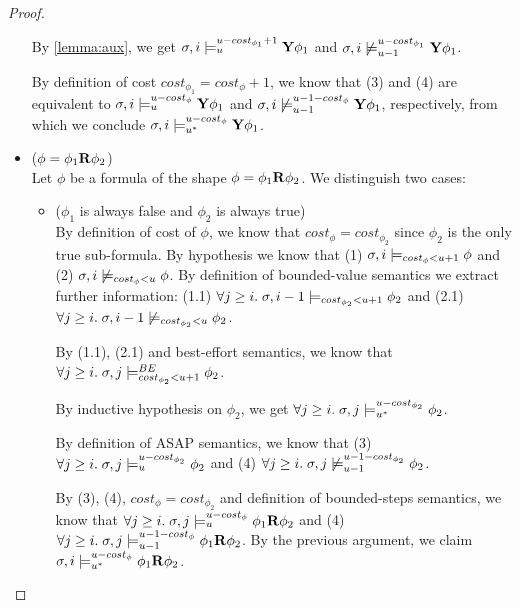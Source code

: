 \begin{theorem}
\begin{proof}
\begin{itemize}
    By \autoref{lemma:aux}, we get $\sigma,i \models_{u}^{u-cost_{\phi_1}+1} \mathbf{Y} \phi_1$ and $\sigma,i \not\models_{u-1}^{u-cost_{\phi_1}} \mathbf{Y} \phi_1$.
    
    By definition of cost $cost_{\phi_1} = cost_\phi + 1$, we know that (3) and (4) are equivalent to $\sigma,i \models_{u}^{u-cost_\phi} \mathbf{Y} \phi_1$ and $\sigma,i \not\models_{u-1}^{u-1-cost_\phi} \mathbf{Y} \phi_1$, respectively, from which we conclude $\sigma,i \models_{{u}^*}^{u-cost_\phi} \mathbf{Y} \phi_1$.
    
    \item ($\phi = \phi_1 \mathbf{R} \phi_2$) \\ 
    Let $\phi$ be a formula of the shape $\phi = \phi_1 \mathbf{R} \phi_2$.
    We distinguish two cases:
    \begin{itemize}
        \item ($\phi_1$ is always false and $\phi_2$ is always true) \\
        By definition of cost of $\phi$, we know that $cost_\phi = cost_{\phi_2}$ since $\phi_2$ is the only true sub-formula.
        By hypothesis we know that 
        (1) $\sigma, i \models_{cost_\phi < u + 1} \phi$ and 
        (2) $\sigma, i \not\models_{cost_\phi < u} \phi$.
        By definition of bounded-value semantics we extract further information: 
        (1.1) $\forall j \geq i.\; \sigma,i-1 \models_{cost_{\phi_2} < u + 1} \phi_2$ and
        (2.1) $\forall j \geq i.\; \sigma,i-1 \not\models_{cost_{\phi_2} < u} \phi_2$.

        By (1.1), (2.1) and best-effort semantics, we know that $\forall j \geq i.\; \sigma,j \models_{cost_{\phi_2} < u + 1}^{BE} \phi_2$.

        By inductive hypothesis on $\phi_2$, we get $\forall j \geq i.\; \sigma,j \models_{{u}^*}^{u-cost_{\phi_2}} \phi_2$.

        By definition of ASAP semantics, we know that (3) $\forall j \geq i.\; \sigma,j \models_{u}^{u-cost_{\phi_2}} \phi_2$ and (4) $\forall j \geq i.\; \sigma,j \not\models_{u-1}^{u-1-cost_{\phi_2}} \phi_2$.

        By (3), (4), $cost_\phi = cost_{\phi_2}$ and definition of bounded-steps semantics, we know that $\forall j \geq i.\; \sigma,j \models_{u}^{u-cost_{\phi}} \phi_1 \mathbf{R} \phi_2$ and (4) $\forall j \geq i.\; \sigma,j \models_{u-1}^{u-1-cost_{\phi}} \phi_1 \mathbf{R} \phi_2$.
        By the previous argument, we claim $\sigma,i \models_{{u}^*}^{u-cost_\phi} \phi_1 \mathbf{R} \phi_2$.


\end{itemize}
\end{itemize}
\end{proof}
\end{theorem}
